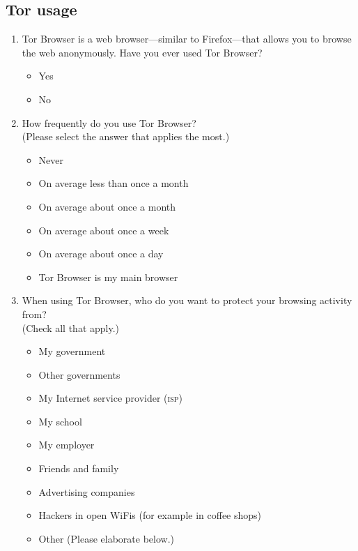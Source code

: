 \subsection{Tor usage}
\begin{enumerate}
    \item Tor Browser is a web browser---similar to Firefox---that allows you
        to browse the web anonymously. Have you ever used Tor Browser?
        \begin{itemize}[label=$\Circle$]
            \item Yes
            \item No
        \end{itemize}

    \item How frequently do you use Tor Browser?\\(Please select the answer
        that applies the most.)
        \begin{itemize}[label=$\Circle$]
            \item Never
            \item On average less than once a month
            \item On average about once a month
            \item On average about once a week
            \item On average about once a day
            \item Tor Browser is my main browser
        \end{itemize}

    \item When using Tor Browser, who do you want to protect your browsing
        activity from?\\(Check all that apply.)
        \begin{itemize}[label=$\Square$]
            \item My government
            \item Other governments
            \item My Internet service provider (\textsc{isp})
            \item My school
            \item My employer
            \item Friends and family
            \item Advertising companies
            \item Hackers in open WiFis (for example in coffee shops)
            \item Other (Please elaborate below.)
        \end{itemize}


\end{enumerate}
